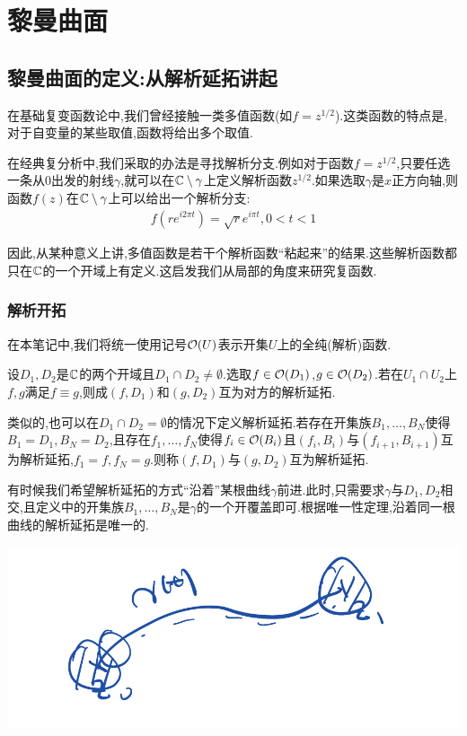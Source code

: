 
\chapter{黎曼曲面}
\section{黎曼曲面的定义:从解析延拓讲起}
在基础复变函数论中,我们曾经接触一类多值函数(如$f=z^{1/2}$).这类函数的特点是,对于自变量的某些取值,函数将给出多个取值.

在经典复分析中,我们采取的办法是寻找解析分支.例如对于函数$f=z^{1/2}$,只要任选一条从$0$出发的射线$\gamma$,就可以在$\mathbb{C} \setminus \gamma$上定义解析函数$z^{1/2}$.如果选取$\gamma$是$x$正方向轴,则函数$f(z)$在$\mathbb{C} \setminus \gamma$上可以给出一个解析分支:
\begin{align*}
	f(r e^{i2\pi t})=\sqrt{r}e^{i\pi t}, 0<t<1
\end{align*}

因此,从某种意义上讲,多值函数是若干个解析函数“粘起来”的结果.这些解析函数都只在$\mathbb{C}$的一个开域上有定义.这启发我们从局部的角度来研究复函数.

\subsection{解析开拓}
在本笔记中,我们将统一使用记号$\mathcal{O}(U)$表示开集$U$上的全纯(解析)函数.
\begin{definition}
	设$D_1,D_2$是$\mathbb{C}$的两个开域且$D_1\cap D_2 \neq \emptyset$.选取$f \in \mathcal{O}(D_1)$,$g \in \mathcal{O}(D_2)$.若在$U_1\cap U_2$上$f,g$满足$f \equiv g$,则成$(f,D_1)$和$(g,D_2)$互为对方的解析延拓.

	类似的,也可以在$D_1\cap D_2=\emptyset$的情况下定义解析延拓.若存在开集族$B_1,\dots,B_N$使得$B_1=D_1,B_N=D_2$,且存在$f_1,\dots,f_N$使得$f_i \in \mathcal{O}(B_i)$且$(f_i,B_i)$与$(f_{i+1},B_{i+1})$互为解析延拓,$f_1=f,f_N=g$.则称$(f,D_1)$与$(g,D_2)$互为解析延拓.
\end{definition}

有时候我们希望解析延拓的方式“沿着”某根曲线$\gamma$前进.此时,只需要求$\gamma$与$D_1,D_2$相交,且定义中的开集族$B_1,\dots,B_N$是$\gamma$的一个开覆盖即可.根据唯一性定理,沿着同一根曲线的解析延拓是唯一的.

\includegraphics[scale=0.25]{resource/extension by lines.png}

